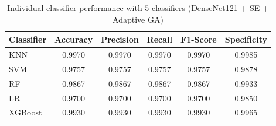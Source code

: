 \begin{table}[htbp]
\centering
\caption{Individual classifier performance with 5 classifiers (DenseNet121 + SE + Adaptive GA)}
\label{tab:table15_ind}
\begin{tabular}{lccccc}
\toprule
Classifier & Accuracy & Precision & Recall & F1-Score & Specificity \\
\midrule
KNN & 0.9970 & 0.9970 & 0.9970 & 0.9970 & 0.9985 \\
SVM & 0.9757 & 0.9757 & 0.9757 & 0.9757 & 0.9878 \\
RF & 0.9867 & 0.9867 & 0.9867 & 0.9867 & 0.9933 \\
LR & 0.9700 & 0.9700 & 0.9700 & 0.9700 & 0.9850 \\
XGBoost & 0.9930 & 0.9930 & 0.9930 & 0.9930 & 0.9965 \\
\bottomrule
\end{tabular}
\end{table}